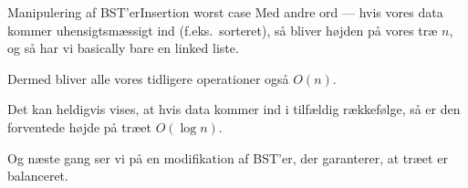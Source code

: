 \documentclass[aspectratio=1610]{beamer}
\begin{document}
\begin{frame}{Manipulering af BST'er}{Insertion worst case}
    Med andre ord --- hvis vores data kommer uhensigtsmæssigt ind (f.eks.\
    sorteret), så bliver højden på vores træ $n$, og så har vi basically bare en
    linked liste.
    
    \vfill

    \pause
    Dermed bliver alle vores tidligere operationer også $O(n)$.

    \vfill

    \pause
    Det kan heldigvis vises, at hvis data kommer ind i tilfældig rækkefølge, så
    er den forventede højde på træet $O(\log n)$.

    \vfill

    \pause
    Og næste gang ser vi på en modifikation af BST'er, der garanterer, at træet
    er balanceret.
\end{frame}
\end{document}
